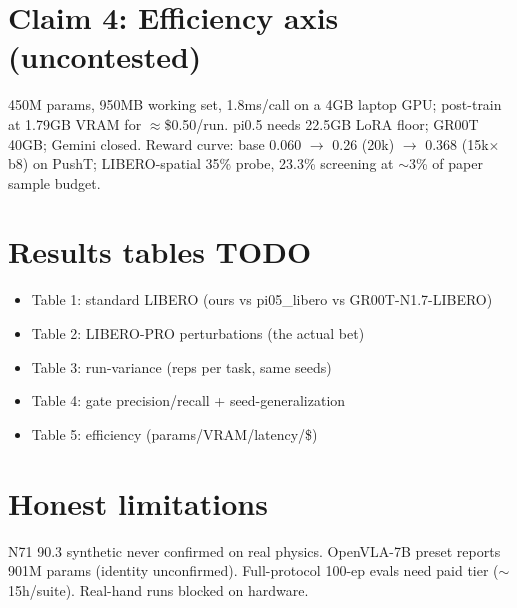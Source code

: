 \documentclass{article}
\begin{document}
\section*{Claim 4: Efficiency axis (uncontested)}
450M params, 950MB working set, 1.8ms/call on a 4GB laptop GPU;
post-train at 1.79GB VRAM for $\approx$\$0.50/run. pi0.5 needs 22.5GB LoRA
floor; GR00T 40GB; Gemini closed. Reward curve: base 0.060 $\to$ 0.26 (20k)
$\to$ 0.368 (15k$\times$b8) on PushT; LIBERO-spatial 35\% probe, 23.3\%
screening at $\sim$3\% of paper sample budget.

\section*{Results tables TODO}
\begin{itemize}
\item Table 1: standard LIBERO (ours vs pi05\_libero vs GR00T-N1.7-LIBERO)
\item Table 2: LIBERO-PRO perturbations (the actual bet)
\item Table 3: run-variance (reps per task, same seeds)
\item Table 4: gate precision/recall + seed-generalization
\item Table 5: efficiency (params/VRAM/latency/\$)
\end{itemize}

\section*{Honest limitations}
N71 90.3 synthetic never confirmed on real physics. OpenVLA-7B preset
reports 901M params (identity unconfirmed). Full-protocol 100-ep evals need
paid tier ($\sim$15h/suite). Real-hand runs blocked on hardware.
\end{document}
